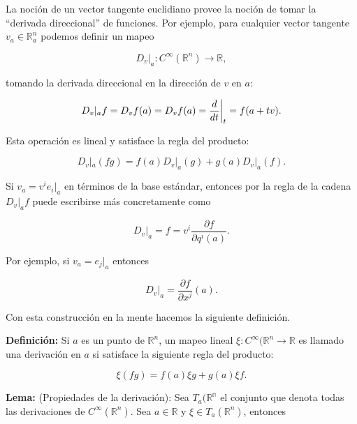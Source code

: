 \documentclass[a4paper,10pt]{article}
\numberwithin{equation}{section}
\newcommand{\zerodel}{.\kern-\nulldelimiterspace}
\newcommand{\definicion}{\textbf{Definición: }}
\newcommand{\lema}{\textbf{Lema: }}
\begin{document}
\vspace{.3cm}

La noción de un vector tangente euclidiano provee la noción de tomar la ``derivada 
direccional'' de funciones. Por ejemplo, para cualquier vector tangente $v_a \in \mathbb{R}^n_a$ 
podemos definir un mapeo 

\begin{equation}
 D_v|_a: C^{\infty}(\mathbb{R}^n) \rightarrow \mathbb{R},
\end{equation}

tomando la derivada direccional en la dirección de $v$ en $a$:

\begin{equation}
 D_v|_a f = D_v f(a) = D_v f(a) = \left\zerodel\frac{d}{dt}\right|_t= f(a+tv).
\end{equation}

Esta operación es lineal y satisface la regla del producto:

\begin{equation}
 D_v|_a (fg) = f(a)D_v|_a(g) + g(a)D_v|_a(f).
\end{equation}

Si $v_a = v^ie_i|_a$ en términos de la base estándar, entonces por la regla de la 
cadena $D_v|_a f$ puede escribirse más concretamente como 

\begin{equation}
 D_v|_a = f = v^i\frac{\partial f}{\partial q^i (a)}.
\end{equation}

Por ejemplo, si $v_a = e_j|_a$ entonces 

\begin{equation}
 D_v|_a = \frac{\partial f}{\partial x^j}(a).
\end{equation}

Con esta construcción en la mente hacemos la siguiente definición. 

\vspace{.3cm}

\definicion Si $a$ es un punto de $\mathbb{R}^n$, un mapeo lineal
$\xi:C^{\infty}(\mathbb{R}^n \rightarrow \mathbb{R}$ es llamado una derivación 
en $a$ si satisface la siguiente regla del producto:

\begin{equation}
 \xi(fg) = f(a)\xi g + g(a)\xi f.
\end{equation}

\lema (Propiedades de la derivación): Sea $T_a(\mathbb{R^n}$ el conjunto que denota todas las derivaciones de $C^{\infty}(\mathbb{R}^n)$.
Sea $a \in \mathbb{R}$ y $\xi \in T_a(\mathbb{R}^n)$, entonces 
\end{document}
